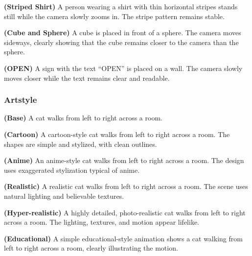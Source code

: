 \documentclass[sigconf]{acmart}
\begin{document}
\begin{enumerate}[label=\textbf{Prompt [\arabic*]}, leftmargin=*]
    \item \label{prompt:10}
          \textbf{(Striped Shirt)} A person wearing a shirt with thin horizontal stripes stands still while the camera slowly zooms in. The stripe pattern remains stable.

    \item \label{prompt:11}
          \textbf{(Cube and Sphere)} A cube is placed in front of a sphere. The camera moves sideways, clearly showing that the cube remains closer to the camera than the sphere.

    \item \label{prompt:12}
          \textbf{(OPEN)} A sign with the text “OPEN” is placed on a wall. The camera slowly moves closer while the text remains clear and readable.

\end{enumerate}


\subsubsection{Artstyle}

\begin{enumerate}[label=\textbf{Prompt [\Alph*]}, leftmargin=*]

    \item \label{prompt:a}
          \textbf{(Base)} A cat walks from left to right across a room.

    \item \label{prompt:b}
          \textbf{(Cartoon)}  A cartoon-style cat walks from left to right across a room. The shapes are simple and stylized, with clean outlines.

    \item \label{prompt:c}
          \textbf{(Anime)} An anime-style cat walks from left to right across a room. The design uses exaggerated stylization typical of anime.

    \item \label{prompt:d}
          \textbf{(Realistic)} A realistic cat walks from left to right across a room. The scene uses natural lighting and believable textures.

    \item \label{prompt:e}
          \textbf{(Hyper-realistic)} A highly detailed, photo-realistic cat walks from left to right across a room. The lighting, textures, and motion appear lifelike.

    \item \label{prompt:f}
          \textbf{(Educational)} A simple educational-style animation shows a cat walking from left to right across a room, clearly illustrating the motion.

\end{enumerate}
\end{document}

